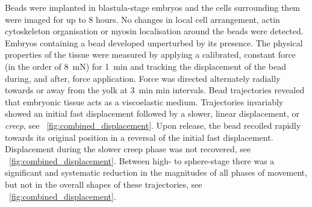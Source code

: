 Beads were implanted in blastula-stage embryos and the cells surrounding them were imaged for up to 8 hours.
No changes in local cell arrangement, actin cytoskeleton organisation or myosin localisation around the beads were detected.
Embryos containing a bead developed unperturbed by its presence.
The physical properties of the tissue were measured by applying a calibrated, constant force (in the order of \SI{8}{\milli\newton}) for \SI{1}{\minute} and tracking the displacement of the bead during, and after, force application.
Force was directed alternately radially towards or away from the yolk at \SI{3}{\minute} min intervals.
Bead trajectories revealed that embryonic tissue acts as a viscoelastic medium.
Trajectories invariably showed an initial fast displacement followed by a slower, linear displacement, or \emph{creep}, see \figurename~\ref{fig:combined_displacement}.
Upon release, the bead recoiled rapidly towards its original position in a reversal of the initial fast displacement.
Displacement during the slower creep phase was not recovered, see \figurename~\ref{fig:combined_displacement}.
Between high- to sphere-stage there was a significant and systematic reduction in the magnitudes of all phases of movement, but not in the overall shapes of these trajectories, see \figurename~\ref{fig:combined_displacement}.


